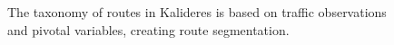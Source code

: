 \begin{figure}[H]
	\centering
	
	\caption*{%
		The taxonomy of routes in Kalideres is based on traffic observations and pivotal variables, creating route segmentation.
	}
	\vspace*{\baselineskip}%
	\label{
		fig:x-transit-hub--routes-taxonomy
	}
\end{figure}
